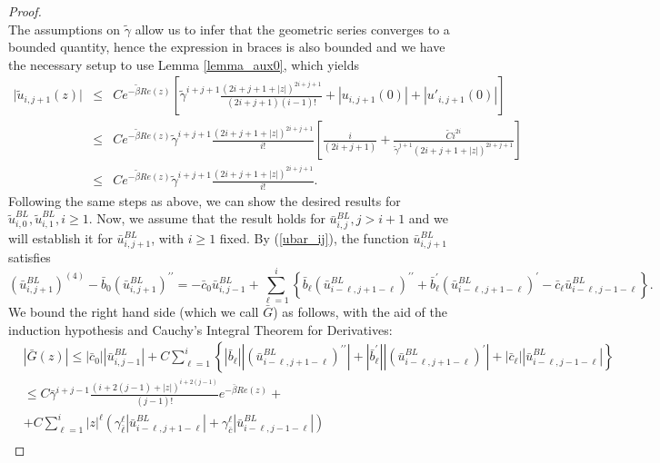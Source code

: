 \documentclass[12pt]{article}
\begin{document}
\begin{proof}
$$$$
%
The assumptions on $\tilde{\gamma}$ allow us to infer that the geometric series converges to a bounded quantity, hence the expression in braces is also bounded and we have the necessary setup to use Lemma \ref{lemma_aux0}, which yields
%
\begin{eqnarray*}
\vert \tilde{u}_{i,j+1}(z) \vert &\leq& C e^{-\tilde{\beta} Re(z)} \left[ \tilde{\gamma}^{i+j+1} \frac{(2i+j+1+|z|)^{2i+j+1}}{(2i+j+1) (i-1)!}
+|{u}_{i,j+1}(0)|+|{u}'_{i,j+1}(0)| \right] \\
&\leq& C e^{-\tilde{\beta} Re(z)} \tilde{\gamma}^{i+j+1} \frac{(2i+j+1+|z|)^{2i+j+1}}{i!} \left[ \frac{i}{(2i+j+1)}+\frac{\tilde{C} i^{2i}}{\tilde{\gamma}^{j+1} (2i+j+1+|z|)^{2i+j+1}} \right] \\
&\leq& C e^{-\tilde{\beta} Re(z)} \tilde{\gamma}^{i+j+1} \frac{(2i+j+1+|z|)^{2i+j+1}}{i!}.
\end{eqnarray*}
%
Following the same steps as above, we can show the desired results for $\tilde{u}^{BL}_{i,0},\tilde{u}^{BL}_{i,1}, i\geq 1$. Now, we assume that the result holds for $\bar{u}^{BL}_{i,j}, j > i+1$ and we will establish it for $\bar{u}^{BL}_{i,j+1}$, with $i\geq 1$ fixed. By (\ref{ubar_ij}), the function $\bar{u}^{BL}_{i,j+1}$ satisfies
%
$$
\left(\bar{u}_{i, j+1}^{B L}\right)^{(4)}-\bar{b}_0\left(\bar{u}_{i, j+1}^{B L}\right)^{\prime \prime}=-\bar{c}_0 \bar{u}_{i, j-1}^{B L}+\sum_{\ell=1}^i\left\{\bar{b}_{\ell}\left(\bar{u}_{i-\ell, j+1-\ell}^{B L}\right)^{\prime \prime}+\bar{b}_{\ell}^{\prime}\left(\bar{u}_{i-\ell, j+1-\ell}^{B L}\right)^{\prime}-\bar{c}_{\ell} \bar{u}_{i-\ell, j-1-\ell}^{B L}\right\} .
$$
%
We bound the right hand side (which we call $\bar{G}$)  as follows, with the aid of the induction hypothesis and Cauchy's Integral Theorem for Derivatives:
$$
\begin{aligned}
& |\bar{G}(z)| \leq\left|\bar{c}_0\right|\left|\bar{u}_{i, j-1}^{B L}\right|+C \sum_{\ell=1}^i\left\{\left|\bar{b}_{\ell}\right|\left|\left(\bar{u}_{i-\ell, j+1-\ell}^{B L}\right)^{\prime \prime}\right|+\left|\bar{b}_{\ell}^{\prime}\right|\left|\left(\bar{u}_{i-\ell, j+1-\ell}^{B L}\right)^{\prime}\right|+\left|\bar{c}_{\ell}\right|\left|\bar{u}_{i-\ell, j-1-\ell}^{B L}\right|\right\} \\
& \leq C \bar{\gamma}^{i+j-1} \frac{(i+2(j-1)+|z|)^{i+2(j-1)}}{(j-1)!} e^{-\bar{\beta} R e(z)}+ \\
& +C \sum_{\ell=1}^i|z|^{\ell}\left(\gamma_{\bar{\ell}}^{\ell}\left|\bar{u}_{i-\ell, j+1-\ell}^{B L}\right|+\gamma_{\bar{c}}^{\ell}\left|\bar{u}_{i-\ell, j-1-\ell}^{B L}\right|\right) \\

\end{aligned}$$
\end{proof}
\end{document}
